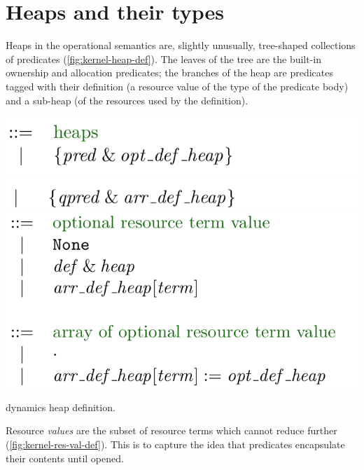 \section{Heaps and their types}\label{sec:heap-types}

Heaps in the operational semantics are, slightly unusually, tree-shaped
collections of predicates (\cref{fig:kernel-heap-def}). The leaves of the tree
are the built-in ownership and allocation predicates; the branches of the heap
are predicates tagged with their definition (a resource value of the type of
the predicate body) and a sub-heap (of the resources used by the definition).

\begin{marginfigure}
    \includegraphics{figures/kernel-dynamics-heap-1}
    \includegraphics{figures/kernel-dynamics-heap-2}
    \includegraphics{figures/kernel-dynamics-heap-3}
    \caption{ dynamics heap definition.}\label{fig:kernel-heap-def}
\end{marginfigure}

Resource \emph{values} are the subset of resource terms which cannot reduce
further (\cref{fig:kernel-res-val-def}). This is to capture the idea that
predicates encapsulate their contents until opened.

